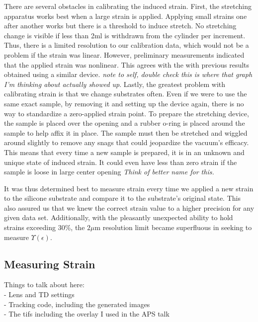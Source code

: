 There are several obstacles in calibrating the induced strain. First, the stretching apparatus works best when a large strain is applied. Applying small strains one after another works but there is a threshold to induce stretch. No stretching change is visible if less than 2ml is withdrawn from the cylinder per increment. Thus, there is a limited resolution to our calibration data, which would not be a problem if the strain was linear. However, preliminary measurements indicated that the applied strain was nonlinear. This agrees with the with previous results \cite{na2008time} obtained using a similar device. \emph{note to self, double check this is where that graph I'm thinking about actually showed up}. Lastly, the greatest problem with calibrating strain is that we change substrates often. Even if we were to use the same exact sample, by removing it and setting up the device again, there is no way to standardize a zero-applied strain point. To prepare the stretching device, the sample is placed over the opening and a rubber o-ring is placed around the sample to help affix it in place. The sample must then be stretched and wiggled around slightly to remove any snags that could jeopardize the vacuum's efficacy. This means that every time a new sample is prepared, it is in an unknown and unique state of induced strain. It could even have less than zero strain if the sample is loose in large center opening \emph{Think of better name for this.} 

It was thus determined best to measure strain every time we applied a new strain to the silicone substrate and compare it to the substrate's original state. This also assured us that we knew the correct strain value to a higher precision for any given data set. Additionally, with the pleasantly unexpected ability to hold strains exceeding 30\%, the $2\mu$m resolution  limit became superfluous in seeking to measure $\Upsilon(\epsilon)$.


\subsection{Measuring Strain}
Things to talk about here:\\
- Lens and TD settings \checkmark \\
- Tracking code, including the generated images \\
- The tifs including the overlay I used in the APS talk \\

